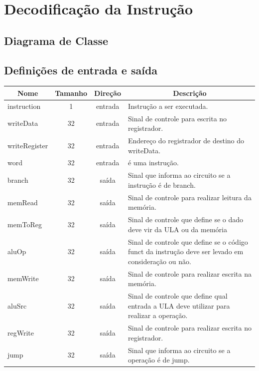 \section{Decodificação da Instrução}
	\subsection{Diagrama de Classe}
  \begin{figure}[H]
    
  \end{figure}
		
		\subsection{Definições de entrada e saída}
		
	\begin{center}
		\begin{longtable}[pos]{| l | c | c | m{7cm} |} \hline
			\multicolumn{1}{|c|}{\cellcolor[gray]{0.9}\textbf{Nome}} & 
			\multicolumn{1}{c|}{\cellcolor[gray]{0.9}\textbf{Tamanho}} & 
			\multicolumn{1}{c|}{\cellcolor[gray]{0.9}\textbf{Direção}} &
			\multicolumn{1}{c|}{\cellcolor[gray]{0.9}\textbf{Descrição}} \\ \hline
			\endhead
			\hline
			\endlastfoot
			
			instruction & 1 & entrada & Instrução a ser executada. \\ \hline
			writeData & 32 & entrada & Sinal de controle para escrita no registrador. \\ \hline
			writeRegister & 32 & entrada & Endereço do registrador de destino do writeData. \\ \hline
			word & 32 & entrada & é uma instrução. \\ \hline
			branch & 32 & saída & Sinal que informa ao circuito se a instrução é de branch. \\ \hline
			memRead & 32 & saída & Sinal de controle para realizar leitura da memória. \\ \hline
			memToReg & 32 & saída & Sinal de controle que define se o dado deve vir da ULA ou da memória \\ \hline
			aluOp & 32 & saída & Sinal de controle que define se o código funct da instrução deve ser levado em consideração ou não. \\ \hline
			memWrite & 32 & saída & Sinal de controle para realizar escrita na memória. \\ \hline
			aluSrc & 32 & saída & Sinal de controle que define qual entrada a ULA deve utilizar para realizar a operação. \\ \hline
			regWrite & 32 & saída & Sinal de controle para realizar escrita no registrador. \\ \hline
			jump & 32 & saída & Sinal que informa ao circuito se a operação é de jump. \\ \hline
		\end{longtable}
	\end{center}
    
